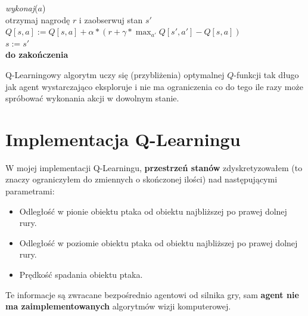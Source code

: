 \documentclass[a4paper, 12pt,twoside]{report}
\begin{document}
\begin{algorithm}
\begin{algorithmic}[1]
		\hspace{\algorithmicindent}
		\hspace{\algorithmicindent}\textit{wykonaj}($a$)\\
		\hspace{\algorithmicindent}
		\hspace{\algorithmicindent}otrzymaj nagrodę $r$ i
						zaobserwuj stan $s'$\\
		\hspace{\algorithmicindent}
		\hspace{\algorithmicindent}$Q[s,a] := Q[s,a] + \alpha *
		(r + \gamma * \max_{a'} Q[s',a'] - Q[s,a])$\\
		\hspace{\algorithmicindent}
		\hspace{\algorithmicindent} $s := s'$\\
		\hspace{\algorithmicindent}\textbf{do zakończenia}
	\EndProcedure
\end{algorithmic}
\label{qlearning_algorithm}
\end{algorithm}

Q-Learningowy algorytm uczy się (przybliżenia) optymalnej $Q$-funkcji tak długo
jak agent wystarczająco eksploruje i nie ma ograniczenia co do tego ile razy
może spróbować wykonania akcji w dowolnym stanie.


\section{Implementacja Q-Learningu}
W mojej implementacji Q-Learningu, \textbf{przestrzeń stanów} zdyskretyzowałem
(to znaczy ograniczyłem do zmiennych o skończonej ilości) nad następującymi
parametrami:
\begin{itemize}
	\setlength\itemsep{-0.4em}
	\item Odległość w pionie obiektu ptaka od obiektu najbliższej po prawej
		dolnej rury.
	\item Odległość w poziomie obiektu ptaka od obiektu najbliższej po 
		prawej dolnej rury.
	\item Prędkość spadania obiektu ptaka.
\end{itemize}

Te informacje są zwracane bezpośrednio agentowi od silnika gry, sam 
\textbf{agent nie ma zaimplementowanych} algorytmów wizji komputerowej.
\end{document}
